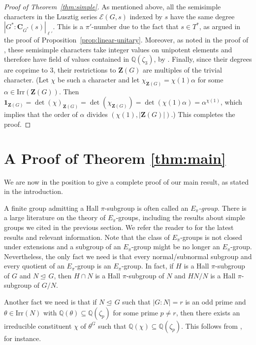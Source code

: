 \documentclass[12pt]{amsart}
\theoremstyle{definition}
\numberwithin{equation}{section}
\newcommand{\Irr}{{\mathrm {Irr}}}
\newcommand{\QQ}{{\mathbb Q}}
\newcommand{\EC}{\mathcal{E}}
\newcommand{\bC}{{\mathbf{C}}}
\newcommand{\bZ}{{\mathbf{Z}}}
\def\nor{\trianglelefteq\,}
\begin{document}
\begin{proof}[Proof of Theorem~\ref{thm:simple}]
As mentioned above, all the semisimple characters in the Lusztig
series $\EC(G,s)$ indexed by $s$ have the same degree
$|G^*:\bC_{G^*}(s)|_{\ell'}$. This is a $\pi'$-number due to the
fact that $s\in T^*$, as argued in the proof of
Proposition~\ref{prop:linear-unitary}. Moreover, as noted in the
proof of \cite[Proposition~4.5]{GHSV21}, these semisimple characters
take integer values on unipotent elements and therefore have field
of values contained in $\QQ(\zeta_3)$, by \cite[Lemma~4.3]{GHSV21}.
Finally, since their degrees are coprime to $3$, their restrictions
to $\bZ(G)$ are multiples of the trivial character. (Let $\chi$ be
such a character and let $\chi_{\bZ(G)}=\chi(1)\alpha$ for some
$\alpha\in\Irr(\bZ(G))$. Then
$\mathbf{1}_{\bZ(G)}=\det(\chi)_{\bZ(G)}=\det(\chi_{\bZ(G)})=\det(\chi(1)\alpha)=\alpha^{\chi(1)}$,
which implies that the order of $\alpha$ divides
$(\chi(1),|\bZ(G)|)$.) This completes the proof.
\end{proof}

\section{A Proof of Theorem \ref{thm:main}}

We are now in the position to give a complete proof of our main result, as stated in the introduction.

A finite group admitting a Hall $\pi$-subgroup is often called an
\emph{$E_\pi$-group}. There is a large literature on the theory of
$E_\pi$-groups, including the results about simple groups we cited in
the previous section. We refer the reader to \cite{RV10} for the
latest results and relevant information. Note that the class of
$E_\pi$-groups is not closed under extensions and a subgroup of an
$E_\pi$-group might be no longer an $E_\pi$-group. Nevertheless, the
only fact we need is that every normal/subnormal subgroup and every
quotient of an $E_\pi$-group is an $E_\pi$-group. In fact, if $H$ is
a Hall $\pi$-subgroup of $G$ and $N\nor G$, then $H\cap N$ is a Hall
$\pi$-subgroup of $N$ and $HN/N$ is a Hall $\pi$-subgroup of $G/N$.


Another fact we need is that if $N\nor G$ such that $|G:N|=r$ is an
odd prime and $\theta\in \Irr(N)$ with $\QQ(\theta)\subseteq
\QQ(\zeta_p)$ for some prime $p\neq r$, then there exists an
irreducible constituent $\chi$ of $\theta^G$ such that
$\QQ(\chi)\subseteq \QQ(\zeta_p)$. This follows from
\cite[Lemma~2.2]{GHSV21}, for instance.
\end{document}
